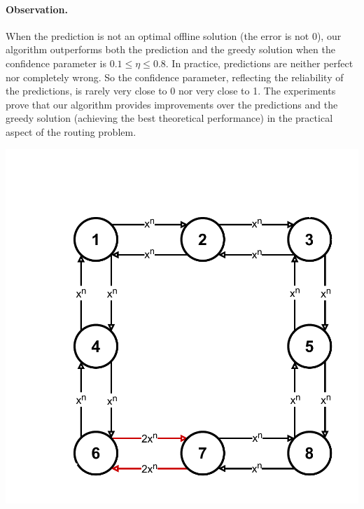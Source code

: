\paragraph{Observation.} When the prediction is not an optimal offline solution (the error is not 0),
our algorithm outperforms both the prediction and the greedy solution when the confidence parameter is $0.1 \leq \eta \leq 0.8$.
In practice, predictions are neither perfect nor completely wrong. So the confidence parameter, reflecting the reliability of the predictions,
is rarely very close to 0 nor very close to 1. The experiments prove that our algorithm provides improvements over the predictions and the greedy solution
(achieving the best theoretical performance) in the practical aspect of the routing problem.

{
    \begin{minipage}{0.3\textwidth}
        \includegraphics[width=\linewidth]{Img/cex_init2.pdf}
    \end{minipage}
    \begin{minipage}{0.3\textwidth}

\end{minipage}}

